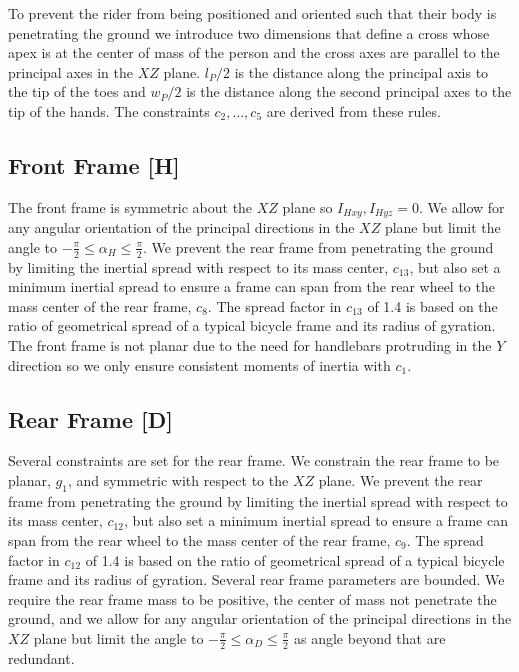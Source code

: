 \documentclass{bmd2019p}
\begin{document}
To prevent the rider from being positioned and oriented such that their body is
penetrating the ground we introduce two dimensions that define a cross whose
apex is at the center of mass of the person and the cross axes are parallel to
the principal axes in the $XZ$ plane. $l_P / 2$ is the distance along the
principal axis to the tip of the toes and $w_P / 2$ is the distance along the
second principal axes to the tip of the hands. The constraints $c_2,\ldots,c_5$
are derived from these rules.

\subsection{Front Frame [H]}
%
The front frame is symmetric about the $XZ$ plane so $I_{Hxy}, I_{Hyz} = 0$. We
allow for any angular orientation of the principal directions in the $XZ$ plane
but limit the angle to $-\frac{\pi}{2} \leq \alpha_H \leq \frac{\pi}{2}$. We
prevent the rear frame from penetrating the ground by limiting the inertial
spread with respect to its mass center, $c_{13}$, but also set a minimum
inertial spread to ensure a frame can span from the rear wheel to the mass
center of the rear frame, $c_8$. The spread factor in $c_{13}$ of 1.4 is based
on the ratio of geometrical spread of a typical bicycle frame and its radius of
gyration. The front frame is not planar due to the need for handlebars
protruding in the $Y$ direction so we only ensure consistent moments of inertia
with $c_1$.

\subsection{Rear Frame [D]}
%
Several constraints are set for the rear frame. We constrain the rear frame to
be planar, $g_1$, and symmetric with respect to the $XZ$ plane. We prevent the
rear frame from penetrating the ground by limiting the inertial spread with
respect to its mass center, $c_{12}$, but also set a minimum inertial spread to
ensure a frame can span from the rear wheel to the mass center of the rear
frame, $c_9$. The spread factor in $c_{12}$ of 1.4 is based on the ratio of
geometrical spread of a typical bicycle frame and its radius of gyration.
Several rear frame parameters are bounded. We require the rear frame mass to be
positive, the center of mass not penetrate the ground, and we allow for any
angular orientation of the principal directions in the $XZ$ plane but limit the
angle to $-\frac{\pi}{2} \leq \alpha_D \leq \frac{\pi}{2}$ as angle beyond that
are redundant.
\end{document}

